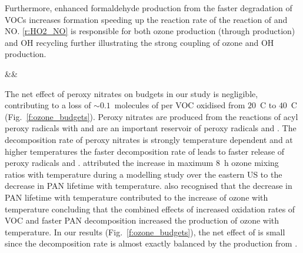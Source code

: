 \vspace{-5mm}
Furthermore, enhanced formaldehyde production from the faster degradation of VOCs increases  formation speeding up the reaction rate of the reaction of  and NO.
\eqref{r:HO2_NO} is responsible for both ozone production (through  production) and OH recycling further illustrating the strong coupling of ozone and OH production.
\vspace{-5mm}
\begin{rxnarray}
    &&  \rightarrow {} \label{r:HO2_NO}
\end{rxnarray} 

\vspace{-5mm}
The net effect of peroxy nitrates on  budgets in our study is negligible, contributing to a loss of $\sim0.1$~molecules of  per VOC oxidised from $20$~\degree C to $40$~\degree C (Fig.~\ref{f:ozone_budgets}).
Peroxy nitrates are produced from the reactions of acyl peroxy radicals with  and are an important reservoir of peroxy radicals and .
The decomposition rate of peroxy nitrates is strongly temperature dependent and at higher temperatures the faster decomposition rate of  leads to faster release of peroxy radicals and .
\citet{Dawson:2007} attributed the increase in maximum 8~h ozone mixing ratios with temperature during a modelling study over the eastern US to the decrease in PAN lifetime with temperature.
\citet{Steiner:2006} also recognised that the decrease in PAN lifetime with temperature contributed to the increase of ozone with temperature concluding that the combined effects of increased oxidation rates of VOC and faster PAN decomposition increased the production of ozone with temperature.
In our results (Fig.~\ref{f:ozone_budgets}), the net effect of  is small since the decomposition rate is almost exactly balanced by the production from .


